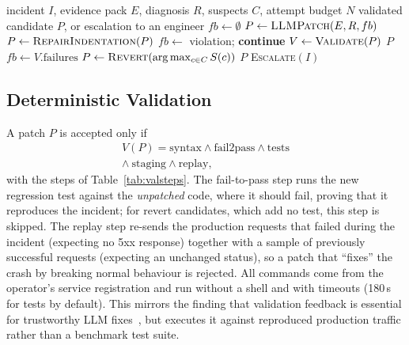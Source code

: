 \documentclass[conference]{IEEEtran}
\begin{document}
\begin{algorithm}[t]
\caption{Generate--validate--repair with revert fallback}
\label{alg:repair}
\small
\begin{algorithmic}[1]
\Require incident $I$, evidence pack $E$, diagnosis $R$, suspects $C$, attempt budget $N$
\Ensure validated candidate $P$, or escalation to an engineer
\State $fb \gets \emptyset$
  \State $P \gets \textsc{LLMPatch}(E, R, fb)$ 
  \State $P \gets \textsc{RepairIndentation}(P)$
   $fb \gets$ violation; \textbf{continue} \EndIf
  \State $V \gets \textsc{Validate}(P)$ 
   \Return $P$  \EndIf
  \State $fb \gets V.\text{failures}$
\EndFor
\State $P \gets \textsc{Revert}(\arg\max_{c \in C} S(c))$
 \Return $P$ \EndIf
\State \Return \textsc{Escalate}$(I)$ 
\end{algorithmic}
\end{algorithm}

\subsection{Deterministic Validation}
\label{sec:valid}
A patch $P$ is accepted only if
\begin{multline}
V(P) = \text{syntax} \wedge \text{fail2pass} \wedge \text{tests} \\
\wedge\ \text{staging} \wedge \text{replay},
\end{multline}
with the steps of Table~\ref{tab:valsteps}. The fail-to-pass step runs the new regression test against the \emph{unpatched} code, where it should fail, proving that it reproduces the incident; for revert candidates, which add no test, this step is skipped. The replay step re-sends the production requests that failed during the incident (expecting no 5xx response) together with a sample of previously successful requests (expecting an unchanged status), so a patch that ``fixes'' the crash by breaking normal behaviour is rejected. All commands come from the operator's service registration and run without a shell and with timeouts (180\,s for tests by default). This mirrors the finding that validation feedback is essential for trustworthy LLM fixes~\cite{kulsum2024vrpilot}, but executes it against reproduced production traffic rather than a benchmark test suite.
\end{document}
